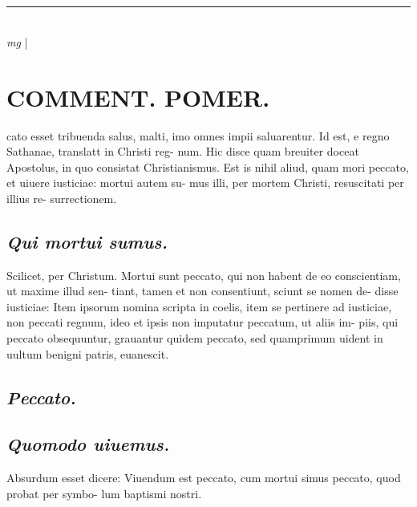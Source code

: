 \documentclass{article}
\begin{document}
\begin{pages}
\section*{}
\marginpar{[ p.]}\pstart  \pend
{}
{}
\subsection*{\textit{}}\pstart  \pend
\vspace{0.5cm}\noindent
\vspace{0.2cm}\rule{1cm}{0.2pt}\\ 
\hspace{0.2cm}\textit{mg}
\footnotesize 
\normalsize| 
\section*{COMMENT. POMER.  }\pstart cato esset tribuenda salus, malti, imo omnes impii saluarentur.  \pend\pstart Id est, e regno Sathanae, translatt in Christi reg- num. Hic disce quam breuiter doceat Apostolus, in quo consistat Christianismus. Est is nihil aliud, quam mori peccato, et uiuere iusticiae: mortui autem su- mus illi, per mortem Christi, resuscitati per illius re- surrectionem.   \pend
{}
{}
\subsection*{\textit{Qui mortui sumus. }}\pstart Scilicet, per Christum. Mortui sunt peccato, qui non habent de eo conscientiam, ut maxime illud sen- tiant, tamen et non consentiunt, sciunt se nomen de- disse iusticiae: Item ipsorum nomina scripta in coelis, item se pertinere ad iusticiae, non peccati regnum, ideo et ipsis non imputatur peccatum, ut aliis im- piis, qui peccato obsequuntur, grauantur quidem peccato, sed quamprimum uident in uultum benigni patris, euanescit.   \pend
{}
{}
\subsection*{\textit{Peccato. }}
{}
\subsection*{\textit{Quomodo uiuemus. }}\pstart Absurdum esset dicere: Viuendum est peccato, cum mortui simus peccato, quod probat per symbo- lum baptismi nostri.   \pend
{}
{}

\end{pages}
\end{document}
